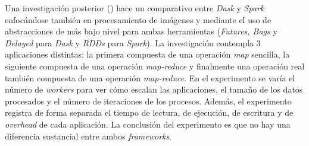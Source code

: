 Una investigación posterior (\cite{dask-spark-neuroimaging}) hace un comparativo entre \textit{Dask} y \textit{Spark} enfocándose también en procesamiento de imágenes y mediante el uso de abstracciones de más bajo nivel para ambas herramientas (\textit{Futures, Bags} y \textit{Delayed} para \textit{Dask} y \textit{RDDs} para \textit{Spark}). La investigación contempla 3 aplicaciones distintas: la primera compuesta de una operación \textit{map} sencilla, la siguiente compuesta de una operación \textit{map-reduce} y finalmente una operación real también compuesta de una operación \textit{map-reduce}. En el experimento se varía el número de \textit{workers} para ver cómo escalan las aplicaciones, el tamaño de los datos procesados y el número de iteraciones de los procesos. Además, el experimento registra de forma separada el tiempo de lectura, de ejecución, de escritura y de \textit{overhead} de cada aplicación. La conclusión del experimento es que no hay una diferencia sustancial entre ambos \textit{frameworks}.

\newpage

